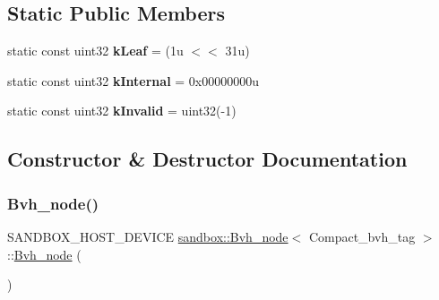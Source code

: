 \subsection*{Static Public Members}
\begin{DoxyCompactItemize}
\item 
\mbox{\label{structsandbox_1_1_bvh__node_3_01_compact__bvh__tag_01_4_a58e190c4633720d676dad2e4b35095c6}} 
static const uint32 {\bfseries k\+Leaf} = (1u $<$$<$ 31u)
\item 
\mbox{\label{structsandbox_1_1_bvh__node_3_01_compact__bvh__tag_01_4_add4dfad9f586e27f0e60fe7edc1c66d9}} 
static const uint32 {\bfseries k\+Internal} = 0x00000000u
\item 
\mbox{\label{structsandbox_1_1_bvh__node_3_01_compact__bvh__tag_01_4_a02292d3f2ac08012bca5cedec436cbf9}} 
static const uint32 {\bfseries k\+Invalid} = uint32(-\/1)
\end{DoxyCompactItemize}


\subsection{Constructor \& Destructor Documentation}
\mbox{\label{structsandbox_1_1_bvh__node_3_01_compact__bvh__tag_01_4_a1ace7c8c3d0c5ad6cca5fc6efa95a7bd}} 
\subsubsection{\texorpdfstring{Bvh\+\_\+node()}{Bvh\_node()}\hspace{0.1cm}{\footnotesize\ttfamily [1/2]}}
{\footnotesize\ttfamily S\+A\+N\+D\+B\+O\+X\+\_\+\+H\+O\+S\+T\+\_\+\+D\+E\+V\+I\+CE \hyperlink{structsandbox_1_1_bvh__node}{sandbox\+::\+Bvh\+\_\+node}$<$ Compact\+\_\+bvh\+\_\+tag $>$\+::\hyperlink{structsandbox_1_1_bvh__node}{Bvh\+\_\+node} (\begin{DoxyParamCaption}{ }\end{DoxyParamCaption})\hspace{0.3cm}{\ttfamily [inline]}}

